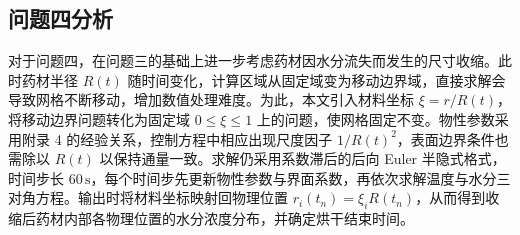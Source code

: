 \documentclass[withoutpreface,bwprint]{cumcm_thesis}
\begin{document}
\subsection{问题四分析}

对于问题四，在问题三的基础上进一步考虑药材因水分流失而发生的尺寸收缩。此时药材半径 \(R(t)\) 随时间变化，计算区域从固定域变为移动边界域，直接求解会导致网格不断移动，增加数值处理难度。为此，本文引入材料坐标 \(\xi = r/R(t)\)，将移动边界问题转化为固定域 \(0\le \xi \le 1\) 上的问题，使网格固定不变。物性参数采用附录 4 的经验关系，控制方程中相应出现尺度因子 \(1/R(t)^2\)，表面边界条件也需除以 \(R(t)\) 以保持通量一致。求解仍采用系数滞后的后向 Euler 半隐式格式，时间步长 \(60\,\text{s}\)，每个时间步先更新物性参数与界面系数，再依次求解温度与水分三对角方程。输出时将材料坐标映射回物理位置 \(r_i(t_n)=\xi_i R(t_n)\)，从而得到收缩后药材内部各物理位置的水分浓度分布，并确定烘干结束时间。


\end{document}

